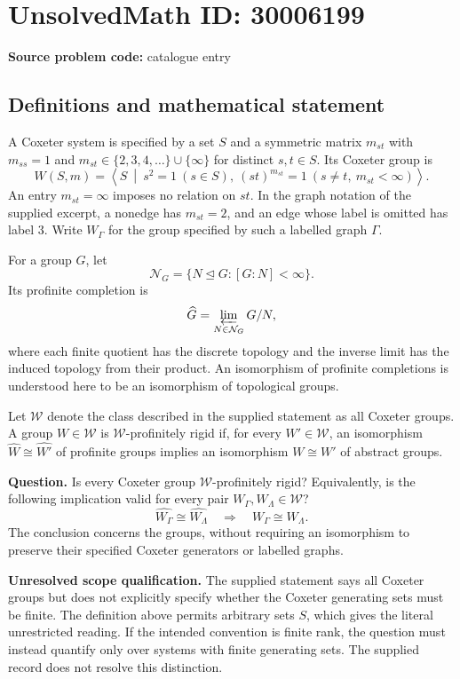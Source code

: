 \documentclass[11pt]{article}
\begin{document}
\section*{UnsolvedMath ID: 30006199}
\textbf{Source problem code:} catalogue entry
\subsection{Definitions and mathematical statement}
A Coxeter system is specified by a set \(S\) and a symmetric matrix \(m_{st}\) with \(m_{ss}=1\) and \(m_{st}\in\{2,3,4,\ldots\}\cup\{\infty\}\) for distinct \(s,t\in S\). Its Coxeter group is
\[
W(S,m)=\left\langle S\ \middle|\ s^2=1\ (s\in S),\ (st)^{m_{st}}=1\ (s\ne t,\ m_{st}<\infty)\right\rangle.
\]
An entry \(m_{st}=\infty\) imposes no relation on \(st\). In the graph notation of the supplied excerpt, a nonedge has \(m_{st}=2\), and an edge whose label is omitted has label \(3\). Write \(W_\Gamma\) for the group specified by such a labelled graph \(\Gamma\).

For a group \(G\), let
\[
\mathcal N_G=\{N\trianglelefteq G:[G:N]<\infty\}.
\]
Its profinite completion is
\[
\widehat G=\varprojlim_{N\in\mathcal N_G}G/N,
\]
where each finite quotient has the discrete topology and the inverse limit has the induced topology from their product. An isomorphism of profinite completions is understood here to be an isomorphism of topological groups.

Let \(\mathcal W\) denote the class described in the supplied statement as all Coxeter groups. A group \(W\in\mathcal W\) is \(\mathcal W\)-profinitely rigid if, for every \(W'\in\mathcal W\), an isomorphism \(\widehat W\cong\widehat{W'}\) of profinite groups implies an isomorphism \(W\cong W'\) of abstract groups.

\textbf{Question.} Is every Coxeter group \(\mathcal W\)-profinitely rigid? Equivalently, is the following implication valid for every pair \(W_\Gamma,W_\Lambda\in\mathcal W\)?
\[
\widehat{W_\Gamma}\cong\widehat{W_\Lambda}
\quad\Longrightarrow\quad
W_\Gamma\cong W_\Lambda.
\]
The conclusion concerns the groups, without requiring an isomorphism to preserve their specified Coxeter generators or labelled graphs.

\textbf{Unresolved scope qualification.} The supplied statement says all Coxeter groups but does not explicitly specify whether the Coxeter generating sets must be finite. The definition above permits arbitrary sets \(S\), which gives the literal unrestricted reading. If the intended convention is finite rank, the question must instead quantify only over systems with finite generating sets. The supplied record does not resolve this distinction.
\end{document}
